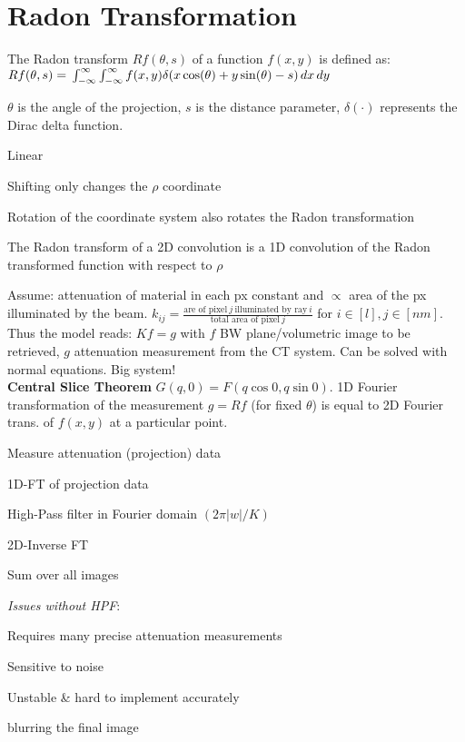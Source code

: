 \section{Radon Transformation}
The Radon transform $Rf(\theta, s)$ of a function $f(x, y)$ is defined as:\\
$
Rf(\theta, s) =\\
\int_{-\infty}^{\infty} \int_{-\infty}^{\infty} f(x, y) \delta(x\cos(\theta) + y\sin(\theta) - s) \,dx\,dy$

 $\theta$ is the angle of the projection, $ s $ is the distance parameter,
 $ \delta(\cdot) $ represents the Dirac delta function.


\begin{compactitem}
    \item Linear
    \item Shifting only changes the \(\rho\) coordinate
    \item Rotation of the coordinate system also rotates the Radon transformation
    \item The Radon transform of a 2D convolution is a 1D convolution of the Radon transformed function with respect to \(\rho\)
\end{compactitem}


  Assume: attenuation of material in each px constant and \(\propto\) area of the px illuminated by the beam.
  \(k_{ij} = \frac{\text{are of pixel} \ j \ \text{illuminated by ray} \ i}{\text{total area of pixel} \ j}\) for \(i \in [l], j \in [nm]\). Thus the model reads:
  \(Kf = g\) with \(f\) BW plane/volumetric image to be retrieved, \(g\) attenuation measurement from the CT system. Can be solved with normal equations. Big system! \\


\textbf{Central Slice Theorem}
  \(G(q, 0) = F(q \cos 0, q \sin 0)\). 1D Fourier transformation of the measurement \(g = Rf\) (for fixed \(\theta\)) is equal to 2D Fourier trans. of \(f(x, y)\) at a particular point. 
\begin{compactenum}
    \item Measure attenuation (projection) data
    \item 1D-FT of projection data
    \item High-Pass filter in Fourier domain \((2 \pi |w| / K)\)
    \item 2D-Inverse FT
    \item Sum over all images
\end{compactenum}

\textit{Issues without HPF}:
  \begin{compactitem}
    \item Requires many precise attenuation measurements
    \item Sensitive to noise
    \item Unstable \& hard to implement accurately
    \item blurring the final image
  \end{compactitem}